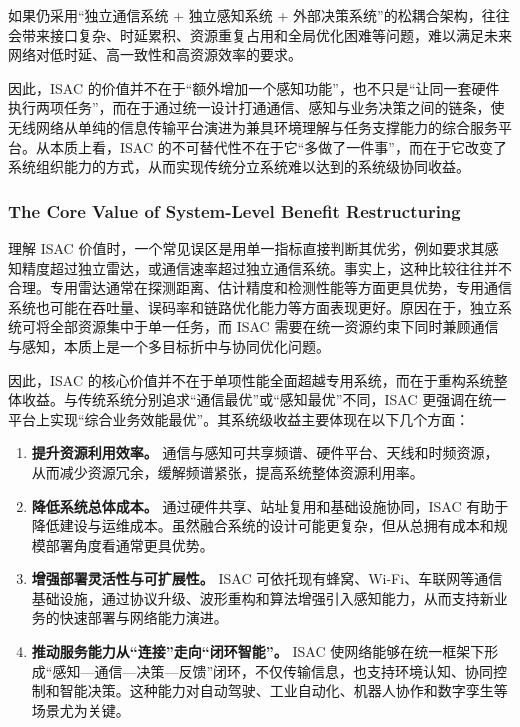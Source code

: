 如果仍采用“独立通信系统 + 独立感知系统 + 外部决策系统”的松耦合架构，往往会带来接口复杂、时延累积、资源重复占用和全局优化困难等问题，难以满足未来网络对低时延、高一致性和高资源效率的要求\cite{Cui2024integrated,Liu2020JointRadarComm}。

因此，ISAC 的价值并不在于“额外增加一个感知功能”，也不只是“让同一套硬件执行两项任务”，而在于通过统一设计打通通信、感知与业务决策之间的链条，使无线网络从单纯的信息传输平台演进为兼具环境理解与任务支撑能力的综合服务平台\cite{Liu2022ISAC,Gonzalez2024integrated}。从本质上看，ISAC 的不可替代性不在于它“多做了一件事”，而在于它改变了系统组织能力的方式，从而实现传统分立系统难以达到的系统级协同收益。

\subsubsection{The Core Value of System-Level Benefit Restructuring}
\label{subsubsec:ch1-isac-core-value-benefit}

理解 ISAC 价值时，一个常见误区是用单一指标直接判断其优劣，例如要求其感知精度超过独立雷达，或通信速率超过独立通信系统。事实上，这种比较往往并不合理。专用雷达通常在探测距离、估计精度和检测性能等方面更具优势，专用通信系统也可能在吞吐量、误码率和链路优化能力等方面表现更好\cite{Goldsmith2005,Liu2022ISAC,SkolnikRadarBook}。原因在于，独立系统可将全部资源集中于单一任务，而 ISAC 需要在统一资源约束下同时兼顾通信与感知，本质上是一个多目标折中与协同优化问题。

因此，ISAC 的核心价值并不在于单项性能全面超越专用系统，而在于重构系统整体收益。与传统系统分别追求“通信最优”或“感知最优”不同，ISAC 更强调在统一平台上实现“综合业务效能最优”\cite{Liu2022ISAC,Gonzalez2024integrated}。其系统级收益主要体现在以下几个方面：

\begin{enumerate}[label=(\arabic*)]
\item \textbf{提升资源利用效率。}
通信与感知可共享频谱、硬件平台、天线和时频资源，从而减少资源冗余，缓解频谱紧张，提高系统整体资源利用率\cite{Liu2020JointRadarComm,Liu2022ISAC,Hassanien2015dual}。

\item \textbf{降低系统总体成本。}
通过硬件共享、站址复用和基础设施协同，ISAC 有助于降低建设与运维成本。虽然融合系统的设计可能更复杂，但从总拥有成本和规模部署角度看通常更具优势\cite{Liu2022ISAC,Wen2024survey}。

\item \textbf{增强部署灵活性与可扩展性。}
ISAC 可依托现有蜂窝、Wi-Fi、车联网等通信基础设施，通过协议升级、波形重构和算法增强引入感知能力，从而支持新业务的快速部署与网络能力演进\cite{Ma2022WiFiSensingSurvey}。

\item \textbf{推动服务能力从“连接”走向“闭环智能”。}
ISAC 使网络能够在统一框架下形成“感知—通信—决策—反馈”闭环，不仅传输信息，也支持环境认知、协同控制和智能决策。这种能力对自动驾驶、工业自动化、机器人协作和数字孪生等场景尤为关键\cite{Gonzalez2024integrated,Saad2020Vision6G}。
\end{enumerate}

